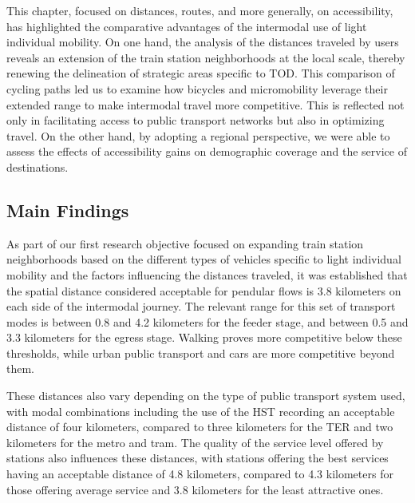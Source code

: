\begin{refsegment}
This chapter, focused on distances, routes, and more generally, on accessibility, has highlighted the comparative advantages of the intermodal use of light individual mobility. On one hand, the analysis of the distances traveled by users reveals an extension of the train station neighborhoods at the local scale, thereby renewing the delineation of strategic areas specific to \acrshort{TOD}. This comparison of cycling paths led us to examine how bicycles and micromobility leverage their extended range to make intermodal travel more competitive. This is reflected not only in facilitating access to public transport networks but also in optimizing travel. On the other hand, by adopting a regional perspective, we were able to assess the effects of accessibility gains on demographic coverage and the service of destinations.%

\subsection*{Main Findings
    \label{chap5:principaux-enseignements}
    }

As part of our first research objective focused on expanding train station neighborhoods based on the different types of vehicles specific to light individual mobility and the factors influencing the distances traveled, it was established that the spatial distance considered acceptable for pendular flows is 3.8 kilometers on each side of the intermodal journey. The relevant range for this set of transport modes is between 0.8 and 4.2 kilometers for the feeder stage, and between 0.5 and 3.3 kilometers for the egress stage. Walking proves more competitive below these thresholds, while urban public transport and cars are more competitive beyond them.%

These distances also vary depending on the type of public transport system used, with modal combinations including the use of the \acrshort{HST} recording an acceptable distance of four kilometers, compared to three kilometers for the \acrshort{TER} and two kilometers for the metro and tram. The quality of the service level offered by stations also influences these distances, with stations offering the best services having an acceptable distance of 4.8 kilometers, compared to 4.3 kilometers for those offering average service and 3.8 kilometers for the least attractive ones.%


\end{refsegment}

